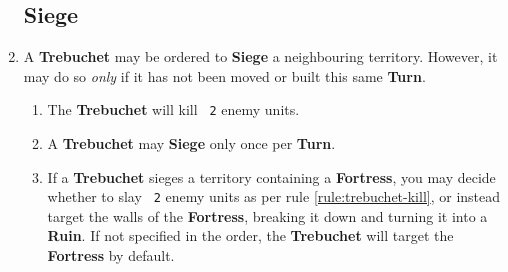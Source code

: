 \documentclass[10pt,openright,a4paper,openany]{article}
\newcommand{\num}[1]{\texttt{\color{purple} {#1}}}
\newcommand{\term}[1]{\textbf{\color{purple} #1}}
\newcommand{\fortress}{\term{Fortress}}
\begin{document}
\begin{enumerate}
	\subsection*{Siege}
	\item A \term{Trebuchet} may be ordered to \term{Siege} a neighbouring territory. However, it may do so \emph{only} if it has not been moved or built this same \term{Turn}.
	\begin{enumerate}
		\item \label{rule:trebuchet-kill}The \term{Trebuchet} will kill \num{2} enemy units.
		\item A \term{Trebuchet} may \term{Siege} only once per \term{Turn}.
	\item If a \term{Trebuchet} sieges a territory containing a \term{Fortress}, you may decide whether to slay \num{2} enemy units as per rule \ref{rule:trebuchet-kill}, or instead target the walls of the \term{Fortress}, breaking it down and turning it into a \term{Ruin}. If not specified in the order, the \term{Trebuchet} will target the \term{Fortress} by default.
	\end{enumerate}


\end{enumerate}
\end{document}

